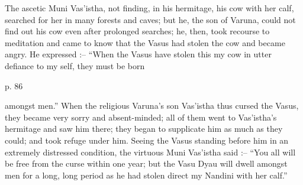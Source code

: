  

The ascetic Muni Vas'istha, not finding, in his hermitage, his cow with her calf, searched for her in many forests and caves; but he, the son of Varuna, could not find out his cow even after prolonged searches; he, then, took recourse to meditation and came to know that the Vasus had stolen the cow and became angry. He expressed :-- “When the Vasus have stolen this my cow in utter defiance to my self, they must be born

 

p. 86

 

amongst men.” When the religious Varuna's son Vas'istha thus cursed the Vasus, they became very sorry and absent-minded; all of them went to Vas'istha's hermitage and saw him there; they began to supplicate him as much as they could; and took refuge under him. Seeing the Vasus standing before him in an extremely distressed condition, the virtuous Muni Vas'istha said :-- “You all will be free from the curse within one year; but the Vasu Dyau will dwell amongst men for a long, long period as he had stolen direct my Nandini with her calf.”

 

